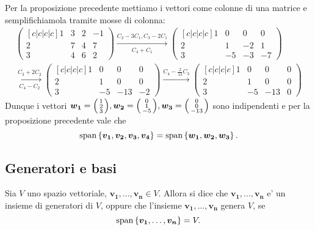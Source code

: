 \begin{solution}
    Per la proposizione precedente mettiamo i vettori come colonne di una matrice e semplifichiamola tramite mosse di colonna:
    \begin{gather*}
        \begin{pmatrix}[c|c|c|c]
            1 & 3 & 2 & -1 \\ 2 & 7 & 4 & 7 \\ 3 & 4 & 6 & 2
        \end{pmatrix} \xrightarrow[C_4 + C_1]{C_2 - 3C_1, C_3 - 2C_1} \begin{pmatrix}
            [c|c|c|c]
            1 & 0 & 0 & 0 \\ 2 & 1 & -2 & 1 \\ 3 & -5 & -3 & -7
        \end{pmatrix} \\ 
        \xrightarrow[C_4 - C_2]{C_3 + 2C_2} \begin{pmatrix}
            [c|c|c|c]
            1 & 0 & 0 & 0 \\ 2 & 1 & 0 & 0 \\ 3 & -5 & -13 & -2
        \end{pmatrix} \xrightarrow[]{C_4 - \frac{2}{13}C_3} \begin{pmatrix}
            [c|c|c|c]
            1 & 0 & 0 & 0 \\ 2 & 1 & 0 & 0 \\ 3 & -5 & -13 & 0
        \end{pmatrix}
    \end{gather*}
    Dunque i vettori $\bm{w_1} = \begin{psmallmatrix} 1 \\ 2 \\ 3 \end{psmallmatrix}, \bm{w_2} = \begin{psmallmatrix} 0 \\ 1 \\ -5 \end{psmallmatrix}, \bm{w_3} = \begin{psmallmatrix} 0 \\ 0 \\ -13 \end{psmallmatrix}$ sono indipendenti e per la proposizione precedente vale che \[
        \operatorname{span}\left\{\bm{v_1}, \bm{v_2}, \bm{v_3}, \bm{v_4}\right\} = \operatorname{span}\left\{\bm{w_1}, \bm{w_2}, \bm{w_3}\right\}.
    \]
\end{solution}

\subsection{Generatori e basi}
\begin{definition}
    Sia $V$ uno spazio vettoriale, $\bm{v_1}, \dots, \bm{v_n} \in V$. Allora si dice che ${\bm{v_1}, \dots, \bm{v_n}}$ e' un insieme di generatori di $V$, oppure che l'insieme ${\bm{v_1}, \dots, \bm{v_n}}$ genera $V$, se
    \begin{equation}
        \operatorname{span}\left\{\bm{v_1}, \dots, \bm{v_n}\right\} = V.
    \end{equation}
\end{definition}

